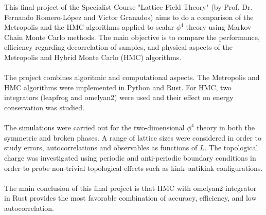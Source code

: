 This final project of the Specialist Course "Lattice Field Theory" (by Prof. Dr. Fernando Romero-López and Victor Granados) aims to do a comparison of the Metropolis and the HMC algorithms applied to scalar $\phi^4$ theory using Markov Chain Monte Carlo methods. The main objective is to compare the performance, efficiency regarding decorrelation of samples, and physical aspects of the Metropolis and Hybrid Monte Carlo (HMC) algorithms.\\\\
The project combines algoritmic and computational aspects. The Metropolis and HMC algorithms were implemented in Python and Rust. For HMC, two integrators (leapfrog and omelyan2) were used and their effect on energy conservation was studied. \\\\
The simulations were carried out for the two-dimensional $\phi^4$ theory in both the symmetric and broken phases. A range of lattice sizes were considered in order to study errors, autocorrelations and observables as functions of $L$. The topological charge was investigated using periodic and anti-periodic boundary conditions in order to probe non-trivial topological effects such as kink–antikink configurations.\\\\
The main conclusion of this final project is that HMC with omelyan2 integrator in Rust provides the most favorable combination of accuracy, efficiency, and low autocorrelation.